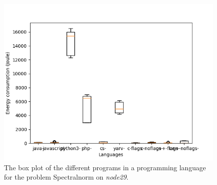 \begin{appendices}
\begin{figure}[h]
    \centering
    \includegraphics[width=.6\textwidth]{graphs/spectralnorm_BOXoverview3.png}
    \caption{The box plot of the different programs in a programming language for the problem Spectralnorm on \textit{node29}.}
    \label{fig:box-spectralnorm3}
\end{figure}

\begin{table}[h]
\centering
{}
\caption{The comparison of the different languages for the Spectralnorm problem on \textit{node28}. A \textit{+} means that the language on the row has a lower energy consumption then the language on the column, the opposite for \textit{-}, and the \textit{Unknown} means that we could not reject the null hypothesis.}
\label{tab:lang-spectralnorm3}
\end{table}


\end{appendices}
